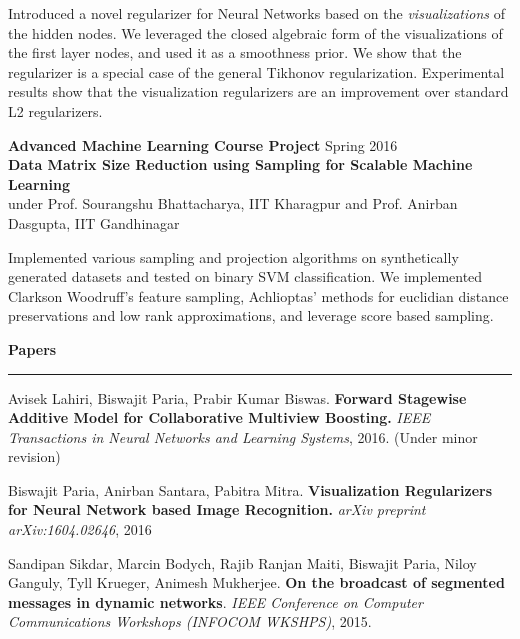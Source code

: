 \documentclass[10pt]{article}
\newcommand{\heading}[1]{
 {\large \textbf{#1}}
  \vspace{0.4em}
  \hrule
  \vspace{0.4em}
}
\newcommand{\EntryGap}{\vspace{0.5cm}}
\newcommand{\SmallEntryGap}{\vspace{0.2cm}}
\newcommand{\indentedpar}[1]{
  \hangindent=1cm \hangafter=0 #1
}
\begin{document}
\SmallEntryGap

\indentedpar{
    Introduced a novel regularizer for Neural Networks
    based on the \emph{visualizations} of the hidden nodes. 
    We leveraged the closed algebraic form of the
    visualizations of the first layer nodes, and used it as a smoothness prior.
    We show that the regularizer is a special case of the 
    general Tikhonov regularization. Experimental results show that the 
    visualization regularizers are an improvement over standard L2 regularizers.
}

\SmallEntryGap

\textbf{Advanced Machine Learning Course Project} \hfill Spring 2016 \\
\textbf{Data Matrix Size Reduction using Sampling for Scalable Machine Learning}\\
under Prof. Sourangshu Bhattacharya, IIT Kharagpur and Prof. Anirban Dasgupta, IIT Gandhinagar

\SmallEntryGap

\indentedpar{
  Implemented various sampling and projection algorithms on synthetically generated
  datasets and tested on binary SVM classification. We implemented Clarkson Woodruff's
  feature sampling, Achlioptas' methods for euclidian distance preservations and 
  low rank approximations, and leverage score based sampling.
}


\EntryGap

\heading{Papers}
  
  Avisek Lahiri, Biswajit Paria, Prabir Kumar Biswas. 
  \textbf{Forward Stagewise Additive Model for Collaborative Multiview Boosting.}
  \emph{IEEE Transactions in Neural Networks and Learning Systems}, 2016.
  (Under minor revision)
  
  \SmallEntryGap
  Biswajit Paria, Anirban Santara, Pabitra Mitra.
  \textbf{Visualization Regularizers for Neural Network based Image Recognition.}
  \emph{arXiv preprint arXiv:1604.02646}, 2016
  
  \SmallEntryGap
  Sandipan Sikdar, Marcin Bodych, Rajib Ranjan Maiti, Biswajit Paria, 
  Niloy Ganguly, Tyll Krueger, Animesh Mukherjee.
  \textbf{On the broadcast of segmented messages in dynamic networks}.
  \emph{IEEE Conference on Computer Communications Workshops (INFOCOM WKSHPS)}, 2015.



\EntryGap
\end{document}
